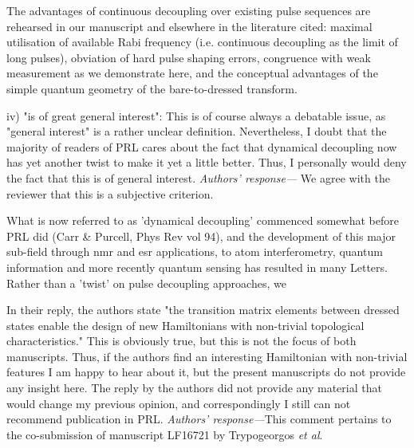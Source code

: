 \documentclass[letterpaper]{article}
\newenvironment{refcomment}{\singlespacing\verbatim}{\endverbatim}
\newcommand{\response}{\emph{Authors' response---}}
\begin{document}
The advantages of continuous decoupling over existing pulse sequences are rehearsed in our manuscript and elsewhere in the literature cited: maximal utilisation of available Rabi frequency (i.e. continuous decoupling as the limit of long pulses), obviation of hard pulse shaping errors, congruence with weak measurement as we demonstrate here, and the conceptual advantages of the simple quantum geometry of the bare-to-dressed transform.

\begin{refcomment}
iv) "is of great general interest": This is of course always a
debatable issue, as "general interest" is a rather unclear definition.
Nevertheless, I doubt that the majority of readers of PRL cares about
the fact that dynamical decoupling now has yet another twist to make
it yet a little better. Thus, I personally would deny the fact that
this is of general interest.
\end{refcomment}
\response
We agree with the reviewer that this is a subjective criterion.

What is now referred to as 'dynamical decoupling' commenced somewhat before PRL did (Carr \& Purcell, Phys Rev vol 94), and the development of this major sub-field through nmr and esr applications, to atom interferometry, quantum information and more recently quantum sensing has resulted in many Letters. Rather than a 'twist' on pulse decoupling approaches, we 

\begin{refcomment}
In their reply, the authors state "the transition matrix
elements between dressed states enable the design of
new Hamiltonians with non-trivial topological 
characteristics." This is obviously true, but this is not the focus
of both manuscripts. Thus, if the authors find an interesting
Hamiltonian with non-trivial features I am happy to hear about it, but
the present manuscripts do not provide any insight here. The reply by
the authors did not provide any material that would change my previous
opinion, and correspondingly I still can not recommend publication in
PRL.
\end{refcomment}
\response This comment pertains to the co-submission of manuscript LF16721 by Trypogeorgos \textit{et al}.
\end{document}

